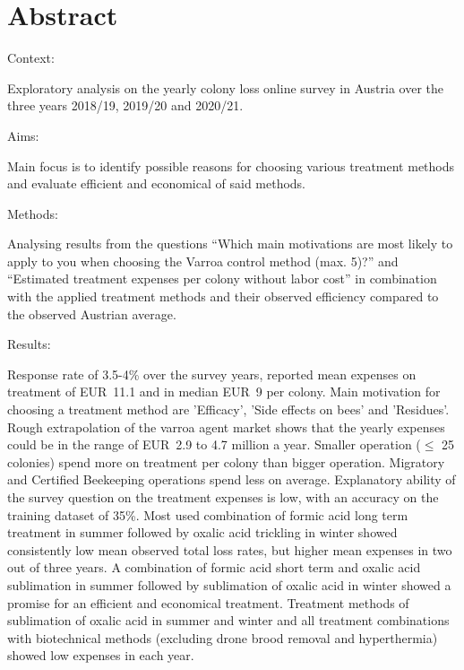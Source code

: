 \chapter*{Abstract}
\label{sec:abstract}
\vspace*{-10mm}

Context:

Exploratory analysis on the yearly colony loss online survey in Austria over the three years 2018/19, 2019/20 and 2020/21.

Aims:

Main focus is to identify possible reasons for choosing various treatment methods and evaluate efficient and economical of said methods.

Methods:

Analysing results from the questions \enquote{Which main motivations are most likely to apply to you when choosing the Varroa control method (max. 5)?} and \enquote{Estimated treatment expenses per colony without labor cost} in combination with the applied treatment methods and their observed efficiency compared to the observed Austrian average.

Results:

Response rate of 3.5-4\% over the survey years, reported mean expenses on treatment of EUR~11.1 and in median EUR~9 per colony. Main motivation for choosing a treatment method are 'Efficacy', 'Side effects on bees' and 'Residues'. Rough extrapolation of the varroa agent market shows that the yearly expenses could be in the range of EUR~2.9 to 4.7 million a year. Smaller operation ($\leq$ 25 colonies) spend more on treatment per colony than bigger operation. Migratory and Certified Beekeeping operations spend less on average. Explanatory ability of the survey question on the treatment expenses is low, with an accuracy on the training dataset of 35\%. Most used combination of formic acid long term treatment in summer followed by oxalic acid trickling in winter showed consistently low mean observed total loss rates, but higher mean expenses in two out of three years. A combination of formic acid short term and oxalic acid sublimation in summer followed by sublimation of oxalic acid in winter showed a promise for an efficient and economical treatment. Treatment methods of sublimation of oxalic acid in summer and winter and all treatment combinations with biotechnical methods (excluding drone brood removal and hyperthermia) showed low expenses in each year.

